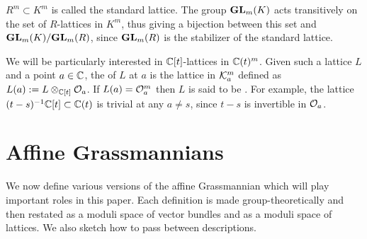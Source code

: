 \documentclass[draft]{article} %
\begin{document}
$ R^m \subset K^m $ is called the standard lattice. 
The group ${\mathbf{GL}}_m(K) $ acts transitively on the set of $R$-lattices in $K^m$, thus giving a bijection between 
this set and ${\mathbf{GL}}_m(K)/{\mathbf{GL}}_m(R)$, since $ {\mathbf{GL}}_m(R) $ is the stabilizer of the standard lattice. 


We will be particularly interested in $\mathbb C[t]$-lattices in $ \mathbb C(t)^m$. 
Given such a lattice $ L $ and a point $ a \in \mathbb C$, the  of $ L $ at $ a $ is the lattice in $\mathcal K_a^m$ defined as $ L(a) := L \otimes_{\mathbb C[t]} \mathcal O_a $. 
If $L(a) = \mathcal O_a^m$ then $L$ is said to be . 
For example, the lattice $(t-s)^{-1}\mathbb C[t] \subset \mathbb C(t)$ is trivial at any $a\ne s$, since $ t-s $ is invertible in $ \mathcal O_a$. 





\section{Affine Grassmannians} 
\label{s:affgrs}
% 
We now define various versions of the affine Grassmannian which will play important roles in this paper. 
% 
Each definition is made group-theoretically and then restated as a moduli space of vector bundles and as a moduli space of lattices.
% 
We also sketch how to pass between descriptions.  
\end{document}
